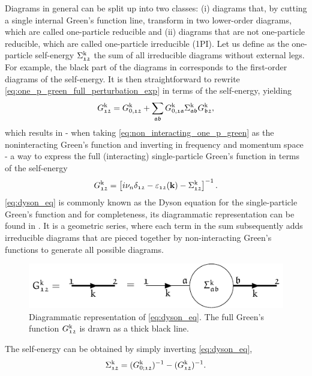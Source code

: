 \documentclass[\main/main.tex]{subfiles}
\begin{document}
Diagrams in general can be split up into two classes: (i) diagrams that, by cutting a single internal Green's function line, transform in two lower-order diagrams, which are called one-particle reducible and (ii) diagrams that are not one-particle reducible, which are called one-particle irreducible (1PI). Let us define as the one-particle self-energy $\Sigma_{\mathfrak{12}}^{\text{k}}$ the sum of all irreducible diagrams without external legs. For example, the black part of the diagrams in  corresponds to the first-order diagrams of the self-energy. It is then straightforward to rewrite \eqref{eq:one_p_green_full_perturbation_exp} in terms of the self-energy, yielding
\begin{align}\label{eq:dyson_eq}
	G_{\mathfrak{12}}^{\text{k}}=G_{0,\mathfrak{12}}^{\text{k}}+\sum_{\mathfrak{ab}}G_{0,\mathfrak{1a}}^{\text{k}}\Sigma_{\mathfrak{ab}}^{\text{k}}G_{\mathfrak{b2}}^{\text{k}},
\end{align}
which results in - when taking \eqref{eq:non_interacting_one_p_green} as the noninteracting Green's function and inverting in frequency and momentum space - a way to express the full (interacting) single-particle Green's function in terms of the self-energy
\begin{align}
	G_{\mathfrak{12}}^{\text{k}} = \left [i\nu_n\delta_{\mathfrak{12}}-\varepsilon_{\mathfrak{12}}(\textbf{k})-\Sigma_{\mathfrak{12}}^{\text{k}}\right ]^{-1}.
\end{align}
\eqref{eq:dyson_eq} is commonly known as the Dyson equation for the single-particle Green's function and for completeness, its diagrammatic representation can be found in . It is a geometric series, where each term in the sum subsequently adds irreducible diagrams that are pieced together by non-interacting Green's functions to generate all possible diagrams.
\begin{figure}[ht!]
	\centering
	\includegraphics[scale=1.2]{Graphics/Diagrams/dyson_eq/dyson_eq}
	\caption{Diagrammatic representation of \eqref{eq:dyson_eq}. The full Green's function $G_{\mathfrak{12}}^{\text{k}}$ is drawn as a thick black line.}
	\label{fig:dyson_eq}
\end{figure}
The self-energy can be obtained by simply inverting \eqref{eq:dyson_eq},
\begin{align}
	\Sigma_{\mathfrak{12}}^{\text{k}}=(G_{0;\mathfrak{12}}^{\text{k}})^{-1}-(G_{\mathfrak{12}}^{\text{k}})^{-1}.
\end{align}
\end{document}
